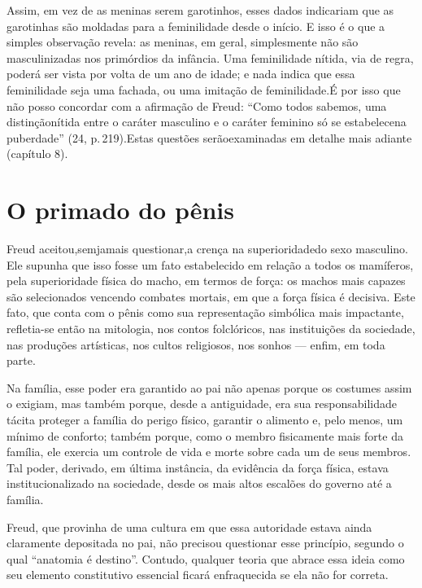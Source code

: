  Assim, em vez de as meninas serem garotinhos, esses dados indicariam
que as garotinhas são moldadas para a feminilidade desde o início. E
isso é o que a simples observação revela: as meninas, em geral,
simplesmente não são masculinizadas nos primórdios da infância. Uma
feminilidade nítida, via de regra, poderá ser vista por volta de um ano
de idade; e nada indica que essa feminilidade seja uma fachada, ou uma
imitação de feminilidade.\idxfeminsimb[|)] É por isso que não posso concordar com a
afirmação de Freud: ``Como todos sabemos, uma distinção\idxrelpciden[|)]
nítida entre o caráter masculino e o caráter feminino só se estabelece\idxidenedi[|)]
na puberdade'' (24, p.\,219).\idxconfe[|)] Estas questões serão\idxfeminconf[|)]
examinadas em detalhe mais adiante (capítulo 8).


\section{O primado do pênis}

Freud aceitou,\idxfreudsuper[|(] sem\idxpenisprim[|(] jamais questionar,\idxmascsu[|(] a crença na superioridade\idxcondfinfe[|(] do sexo
masculino. Ele supunha que isso fosse um fato estabelecido em relação a
todos os mamíferos, pela superioridade física do macho, em termos de
força: os machos mais capazes são selecionados vencendo combates
mortais, em que a força física é decisiva. Este fato, que conta com o
pênis como sua representação simbólica mais impactante, refletia-se
então na mitologia, nos contos folclóricos, nas instituições da
sociedade, nas produções artísticas, nos cultos religiosos, nos sonhos
--- enfim, em toda parte.

 Na família, esse poder era garantido ao pai não apenas porque os
costumes assim o exigiam, mas também porque, desde a antiguidade, era
sua responsabilidade tácita proteger a família do perigo físico,
garantir o alimento e, pelo menos, um mínimo de conforto; também
porque, como o membro fisicamente mais forte da família, ele exercia um
controle de vida e morte sobre cada um de seus membros. Tal poder,
derivado, em última instância, da evidência da força física,\idxpaisauto{} estava
institucionalizado na sociedade, desde os mais altos escalões do
governo até a família.

 Freud,\idxfreudident{} que provinha de uma cultura em que essa autoridade estava ainda
claramente depositada no pai, não precisou questionar esse princípio,
segundo o qual ``anatomia é destino''.
Contudo, qualquer teoria que abrace essa ideia como seu elemento
constitutivo essencial ficará enfraquecida se ela não for correta.

